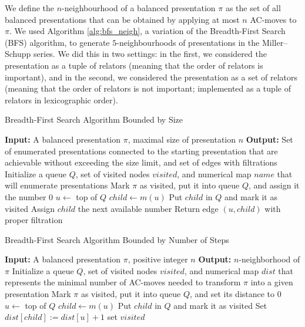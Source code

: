We define the $n$-neighbourhood of a balanced presentation $\pi$ as the set of all balanced presentations that can be obtained by applying at most $n$ AC-moves to $\pi$. We used Algorithm \ref{alg:bfs_neigh}, a variation of the Breadth-First Search (BFS) algorithm, to generate $5$-neighbourhoods of presentations in the Miller–Schupp series. We did this in two settings: in the first, we considered the presentation as a tuple of relators (meaning that the order of relators is important), and in the second, we considered the presentation as a set of relators (meaning that the order of relators is not important; implemented as a tuple of relators in lexicographic order).

\begin{algorithm}
	\caption{Breadth-First Search Algorithm Bounded by Size}\label{alg:bfs_1}
	\begin{algorithmic}[1]
		\State \textbf{Input:} A balanced presentation $\pi$, maximal size of presentation $n$
		\State \textbf{Output:} Set of enumerated presentations connected to the starting presentation that are achievable without exceeding the size limit, and set of edges with filtrations
		\State Initialize a queue $Q$, set of visited nodes $visited$, and numerical map $name$ that will enumerate presentations
		\State Mark $\pi$ as visited, put it into queue $Q$, and assign it the number $0$
		\State $u \gets $ top of $Q$ 
		\State $child \gets m(u)$
		\State Put $child$ in $Q$ and mark it as visited
		\State Assign $child$ the next available number
		\EndIf
		\State Return edge $(u, child)$ with proper filtration
		\EndIf
		\EndFor
		\EndWhile
	\end{algorithmic}
\end{algorithm}

\begin{algorithm}
	\caption{Breadth-First Search Algorithm Bounded by Number of Steps}\label{alg:bfs_neigh}
	\begin{algorithmic}[1]
		\State \textbf{Input:} A balanced presentation $\pi$, positive integer $n$
		\State \textbf{Output:} $n$-neighborhood of $\pi$
		\State Initialize a queue $Q$, set of visited nodes $visited$, and numerical map $dist$ that represents the minimal number of AC-moves needed to transform $\pi$ into a given presentation
		\State Mark $\pi$ as visited, put it into queue $Q$, and set its distance to $0$
		\State $u \gets $ top of $Q$ 
		\State $child \gets m(u)$
		\State Put $child$ in $Q$ and mark it as visited
		\State Set $dist[child] := dist[u] + 1$
		\EndIf
		\EndFor
		\EndWhile
		\Return set $visited$
	\end{algorithmic}
\end{algorithm}
